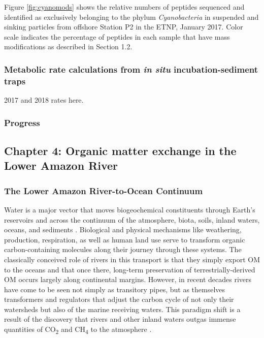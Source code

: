 \documentclass[12pt, letterpaper, twoside]{article}
\begin{document}
Figure \ref{fig:cyanomods} shows the relative numbers of peptides sequenced and identified as exclusively belonging to the phylum \textit{Cyanobacteria} in suspended and sinking particles from offshore Station P2 in the ETNP, January 2017. Color scale indicates the percentage of peptides in each sample that have mass modifications as described in Section 1.2.

\subsubsection{Metabolic rate calculations from \textit{in situ} incubation-sediment traps}

2017 and 2018 rates here. 

\subsubsection*{Progress}

\subsection{Chapter 4: Organic matter exchange in the Lower Amazon River}

\subsubsection{The Lower Amazon River-to-Ocean Continuum}

Water is a major vector that moves biogeochemical constituents through Earth's reservoirs and across the continuum of the atmosphere, biota, soils, inland waters, oceans, and sediments \cite{Cole2007Plumbing}. Biological and physical mechanisms like weathering, production, respiration, as well as human land use serve to transform organic carbon-containing molecules along their journey through these systems. The classically conceived role of rivers in this transport is that they simply export OM to the oceans and that once there, long-term preservation of terrestrially-derived OM occurs largely along continental margins. However, in recent decades rivers have come to be seen not simply as transitory pipes, but as themselves transformers and regulators that adjust the carbon cycle of not only their watersheds but also of the marine receiving waters. This paradigm shift is a result of the discovery that rivers and other inland waters outgas immense quantities of CO\textsubscript{2} and CH\textsubscript{4} to the atmosphere \cite{butman_significant_2011, richey_outgassing_2002}. 
\end{document}
